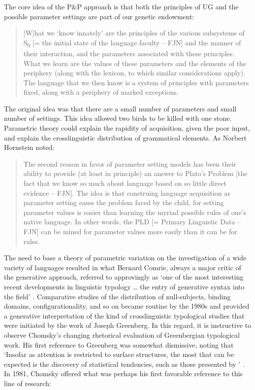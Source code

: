 \documentclass[output=paper,
modfonts
]{LSP/langsci}
\begin{document}
The core idea of the P\&P approach is that both the principles of UG and
the possible parameter settings are part of our genetic endowment:

\begin{quote}
{[}W{]}hat we `know innately' are the principles of the various
subsystems of S\textsubscript{0} {[}= the initial state of the language
faculty  --  FJN{]} and the manner of their interaction, and the
parameters associated with these principles. What we learn are the
values of these parameters and the elements of the periphery (along with
the lexicon, to which similar considerations apply). The language that
we then know is a system of principles with parameters fixed, along with
a periphery of marked exceptions. \citep[150--151]{chomsky1986}
\end{quote}

The original idea was that there are a small number of parameters and
small number of settings. This idea allowed two birds to be killed with
one stone. Parametric theory could explain the rapidity of acquisition,
given the poor input, and explain the crosslinguistic distribution of
grammatical elements. As Norbert Hornstein noted:

\begin{quote}
The second reason in favor of parameter setting models has been their
ability to provide (at least in principle) an answer to Plato's Problem
{[}the fact that we know so much about language based on so little
direct evidence  --  FJN{]}. The idea is that construing language
acquisition as parameter setting eases the problem faced by the child,
for setting parameter values is easier than learning the myriad possible
rules of one's native language. In other words, the PLD {[}= Primary
Linguistic Data  --  FJN{]} can be mined for parameter values more easily
than it can be for rules. \citep[165]{hornstein2009}
\end{quote}

The need to base a theory of parametric variation on the investigation
of a wide variety of languages resulted in what Bernard Comrie, always a
major critic of the generative approach, referred to approvingly as `one
of the most interesting recent developments in linguistic typology {\ldots}
the entry of generative syntax into the field' \citep[458]{comrie1988}.
Comparative studies of the distribution of null-subjects, binding
domains, configurationality, and so on became routine by the 1980s and
provided a generative interpretation of the kind of crosslinguistic
typological studies that were initiated by the work of Joseph Greenberg.
In this regard, it is instructive to observe Chomsky's changing
rhetorical evaluation of Greenbergian typological work. His first
reference to Greenberg was somewhat dismissive, noting that `Insofar as
attention is restricted to surface structures, the most that can be
expected is the discovery of statistical tendencies, such as those
presented by \citet{greenberg1963n}' \citep[118]{chomsky1965}. In 1981, Chomsky
offered what was perhaps his first favorable reference to this line of
research:
\end{document}
